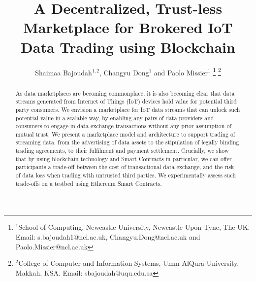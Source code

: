 \documentclass[letterpaper, 10 pt, conference]{ieeeconf}  %
\title{\LARGE \bf
A Decentralized, Trust-less Marketplace for Brokered IoT Data Trading using Blockchain
}
\author{Shaimaa Bajoudah$^{1,2}$, Changyu Dong$^{1}$ and Paolo Missier$^{1}$%
\thanks{$^{1}$School of Computing, Newcastle University, Newcastle Upon Tyne, The UK.
         Email: s.bajoudah1@ncl.ac.uk, Changyu.Dong@ncl.ac.uk and Paolo.Missier@ncl.ac.uk}%
\thanks{$^{2}$College of Computer and Information Systems, Umm AlQura University, Makkah, KSA. Email: sbajoudah@uqu.edu.sa}%
}
\begin{document}
\maketitle
\thispagestyle{empty}
\pagestyle{empty}


\begin{abstract}

As data marketplaces are becoming commonplace, it is also becoming clear that data streams generated from Internet of Things (IoT) devices hold value for potential third party consumers.
We envision a marketplace for IoT data streams that can unlock such potential value in a scalable way, by enabling any pairs of data providers and consumers to engage in data exchange transactions without any prior assumption of mutual trust.
We present a marketplace model and architecture to support trading of streaming data, from the advertising of data assets to the stipulation of legally binding trading agreements, to their fulfilment and payment settlement. Crucially, we show that by using blockchain technology and Smart Contracts in particular, we can offer participants a trade-off between the cost of transactional data exchange, and the risk of data loss when trading with untrusted third parties.
We experimentally assess such trade-offs on a testbed using Ethereum Smart Contracts.
%

\end{abstract}
\end{document}

